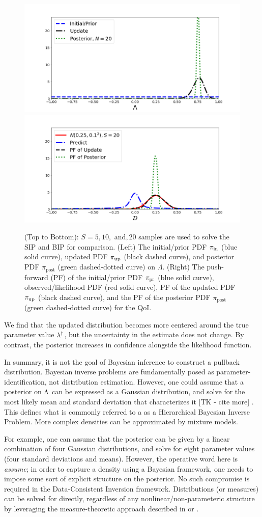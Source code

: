 \begin{ex}
\begin{figure}[htbp]
   \includegraphics[width=0.49\linewidth]{figures/bip-vs-sip-20.png}
   \includegraphics[width=0.49\linewidth]{figures/bip-vs-sip-pf-20.png}
 \caption{(Top to Bottom): $S=5, 10, \text{ and}, 20$ samples are used to solve the SIP and BIP for comparison. (Left) The initial/prior PDF $\operatorname*{\pi_{in}}$ (blue solid curve), updated PDF $\operatorname*{\pi_{up}}$ (black dashed curve), and posterior PDF $\pi_\text{post}$ (green dashed-dotted curve) on $\Lambda$.
 (Right) The push-forward (PF) of the initial/prior PDF $\operatorname*{\pi_{pr}}$ (blue solid curve), observed/likelihood PDF (red solid curve), PF of the updated PDF $\operatorname*{\pi_{up}}$ (black dashed curve), and the PF of the posterior PDF $\pi_\text{post}$ (green dashed-dotted curve) for the QoI.}
 \label{fig:bayes-comparison-convergence}
\end{figure}

We find that the updated distribution becomes more centered around the true parameter value $\lambda^\dagger$, but the uncertainty in the estimate does not change.
By contrast, the posterior increases in confidence alongside the likelihood function.
\end{ex}





In summary, it is not the goal of Bayesian inference to construct a pullback distribution.
Bayesian inverse problems are fundamentally posed as parameter-identification, not distribution estimation.
However, one could assume that a posterior on ${\Lambda}$ can be expressed as a Gaussian distribution, and solve for the most likely mean and standard deviation that characterizes it [TK - cite more] \cite{Smith}.
This defines what is commonly referred to a as a Hierarchical Bayesian Inverse Problem.
More complex densities can be approximated by mixture models.

For example, one can assume that the posterior can be given by a linear combination of four Gaussian distributions, and solve for eight parameter values (four standard deviations and means).
However, the operative word here is \emph{assume}; in order to capture a density using a Bayesian framework, one needs to impose some sort of explicit structure on the posterior.
No such compromise is required in the Data-Consistent Inversion framework.
Distributions (or measures) can be solved for directly, regardless of any nonlinear/non-parameteric structure by leveraging the measure-theoretic approach described in \cite{BE13} or \cite{BJW18}.

